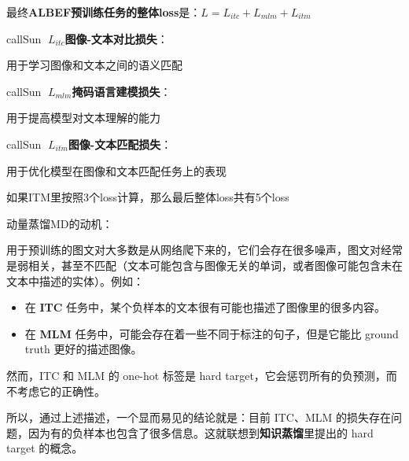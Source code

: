 \documentclass[zihao=false,fontset=windows]{ctexart}
\begin{document}
最终\textbf{ALBEF预训练任务的整体loss}是：$L=L_{itc}+L_{mlm}+L_{itm}$\par
\begin{tcbraster}[raster columns=3, raster equal height=rows, raster column skip=9pt, raster row skip=8pt, raster left skip=0pt, raster right skip=0pt]
\begin{feishuboxnb}{callSun}{🌟}
$L_{itc}$\textbf{图像-文本对比损失}：\par
用于学习图像和文本之间的语义匹配\par
\end{feishuboxnb}
\begin{feishuboxnb}{callSun}{🌟}
$L_{mlm}$\textbf{掩码语言建模损失}：\par
用于提高模型对文本理解的能力\par
\end{feishuboxnb}
\begin{feishuboxnb}{callSun}{🌟}
$L_{itm}$\textbf{图像-文本匹配损失}：\par
用于优化模型在图像和文本匹配任务上的表现\par
\end{feishuboxnb}
\end{tcbraster}
\begin{feishuquote}
如果ITM里按照3个loss计算，那么最后整体loss共有5个loss\par
\end{feishuquote}
\par\vspace{1.15em}\par\vspace{0.28em}
\colorbox{feishuPinkBg}{动量蒸馏MD的动机：}\par
用于预训练的图文对大多数是从网络爬下来的，它们会存在很多噪声，图文对经常是弱相关，甚至不匹配\textcolor{feishuGray2}{（文本可能包含与图像无关的单词，或者图像可能包含未在文本中描述的实体）}。例如：\par
\begin{itemize}
\item 在 \textbf{ITC} 任务中，某个负样本的文本很有可能也描述了图像里的很多内容。
\item 在 \textbf{MLM} 任务中，可能会存在着一些不同于标注的句子，但是它能比 ground truth 更好的描述图像。
\end{itemize}
然而，ITC 和 MLM 的 one-hot 标签是 hard target，它会惩罚所有的负预测，而不考虑它的正确性。\par
所以，通过上述描述，一个显而易见的结论就是：目前 ITC、MLM 的损失存在问题，因为有的负样本也包含了很多信息。这就联想到\textbf{知识蒸馏}里提出的 hard target 的概念。\par
\end{document}
